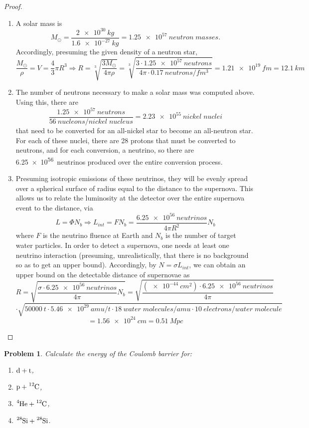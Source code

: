 \documentclass{article}
\newtheorem{plm}{Problem}
\begin{document}
\begin{proof}
  \;
  \begin{enumerate}
  \item A solar mass is
    \[
      M_{\odot} = \frac{\SI{2e30}{kg}}{\SI{1.6e-27}{kg}} = \SI{1.25e57}{neutron\;masses}.
    \]
    Accordingly, presuming the given density of a neutron star,
    \[
      \frac{M_{\odot}}{\rho} = V = \frac{4}{3}\pi R^{3}
      \Rightarrow R = \sqrt[3]{\frac{3M_{\odot}}{4\pi\rho}}
      = \sqrt[3]{\frac{3 \cdot \SI{1.25e57}{neutrons}}{4 \pi \cdot \SI{0.17}{neutrons/fm^{3}}}}
      = \SI{1.21e19}{fm} = \SI{12.1}{km}
    \]
  \item The number of neutrons necessary to make a solar mass was computed above.
    Using this, there are
    \[
      \frac{\SI{1.25e57}{neutrons}}{\SI{56}{nucleons/nickel\; nucleus}}
      = \SI{2.23e55}{nickel\; nuclei}
    \]
    that need to be converted for an all-nickel star to become an all-neutron star.
    For each of these nuclei, there are 28 protons that must be converted to neutrons, and for each conversion, a neutrino,
    so there are \SI{6.25e56}{neutrinos} produced over the entire conversion process.
  \item Presuming isotropic emissions of these neutrinos, they will be evenly spread over a spherical surface
    of radius equal to the distance to the supernova.
    This allows us to relate the luminosity at the detector over the entire supernova event to the distance, via
    \[
      L = \Phi N_{b} \Rightarrow L_{int} = FN_{b} = \frac{\SI{6.25e56}{neutrinos}}{{4}\pi R^{2}}N_{b}
    \]
    where $F$ is the neutrino fluence at Earth and $N_{b}$ is the number of target water particles.
    In order to detect a supernova, one needs at least one neutrino interaction (presuming, unrealistically, that there is no background
    so as to get an upper bound).
    Accordingly, by $N = \sigma L_{int}$, we can obtain an upper bound on the detectable distance of supernovae as
    \[
      R = \sqrt{\frac{\sigma \cdot \SI{6.25e56}{neutrinos}}{4\pi}N_{b}}
      = \sqrt{\frac{(\SI{e-44}{cm^{2}}) \cdot \SI{6.25e56}{neutrinos}}{4\pi}}
    \]
    \[
      \cdot \sqrt{\SI{50000}{t} \cdot \SI{5.46e29}{amu/t} \cdot \SI{18}{water\;molecules/amu}\cdot\SI{10}{electrons/water\;molecule}}
    \]
    \[
      = \SI{1.56e24}{cm} = \SI{0.51}{Mpc}
    \]
  \end{enumerate}
\end{proof}

\begin{plm}
  Calculate the energy of the Coulomb barrier for:
  \begin{enumerate}
  \item $\ce{d + t}$,
  \item $\ce{p + ^{12}C}$,
  \item $\ce{^{4}He + ^{12}C}$,
  \item $\ce{^{28}Si + ^{28}Si}$.
  \end{enumerate}
\end{plm}
\end{document}
